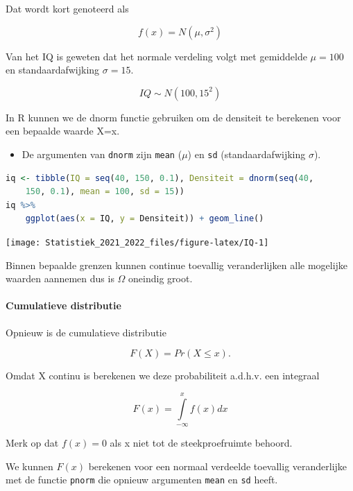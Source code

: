 \documentclass[
  12pt,dutch,coursenotes]{book}
\newcommand{\passthrough}[1]{#1}
\providecommand{\tightlist}{%
  \setlength{\itemsep}{0pt}\setlength{\parskip}{0pt}}
\theoremstyle{definition}
\theoremstyle{definition}
\theoremstyle{definition}
\theoremstyle{definition}
\theoremstyle{remark}
\begin{document}
Dat wordt kort genoteerd als

\[f(x) = N(\mu,\sigma^2)\]

Van het IQ is geweten dat het normale verdeling volgt met gemiddelde \(\mu=100\) en standaardafwijking \(\sigma=15\).

\[IQ \sim N(100,15^2)\]

In R kunnen we de dnorm functie gebruiken om de densiteit te berekenen voor een bepaalde waarde X=x.

\begin{itemize}
\tightlist
\item
  De argumenten van \passthrough{\lstinline!dnorm!} zijn \passthrough{\lstinline!mean!} (\(\mu\)) en \passthrough{\lstinline!sd!} (standaardafwijking \(\sigma\)).
\end{itemize}

\begin{lstlisting}[language=R]
iq <- tibble(IQ = seq(40, 150, 0.1), Densiteit = dnorm(seq(40,
    150, 0.1), mean = 100, sd = 15))
iq %>%
    ggplot(aes(x = IQ, y = Densiteit)) + geom_line()
\end{lstlisting}

\begin{center}\texttt{[image: Statistiek\_2021\_2022\_files/figure-latex/IQ-1]} \end{center}

Binnen bepaalde grenzen kunnen continue toevallig veranderlijken alle mogelijke waarden aannemen dus is \(\Omega\) oneindig groot.

\hypertarget{cumulatieve-distributie}{%
\paragraph{Cumulatieve distributie}\label{cumulatieve-distributie}}

Opnieuw is de cumulatieve distributie

\[F(X)=Pr(X\leq x).\]

Omdat X continu is berekenen we deze probabiliteit a.d.h.v. een integraal

\[F(x)=\int \limits_{-\infty}^x f(x) dx\]

Merk op dat \(f(x)=0\) als x niet tot de steekproefruimte behoord.

We kunnen \(F(x)\) berekenen voor een normaal verdeelde toevallig veranderlijke met de functie \passthrough{\lstinline!pnorm!} die opnieuw argumenten \passthrough{\lstinline!mean!} en \passthrough{\lstinline!sd!} heeft.
\end{document}
